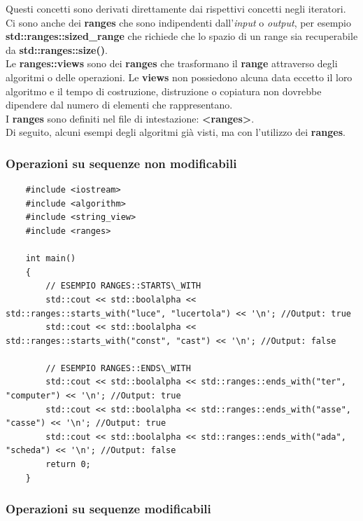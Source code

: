 \textsf{\small Questi concetti sono derivati direttamente dai rispettivi concetti negli iteratori.} \\

\textsf{\small Ci sono anche dei \textbf{ranges} che sono indipendenti dall'\emph{input} o \emph{output}, per esempio \textbf{std::ranges::sized\_range} che richiede che lo spazio di un range sia recuperabile da \textbf{std::ranges::size()}.} \\

\textsf{\small Le \textbf{ranges::views} sono dei \textbf{ranges} che trasformano il \textbf{range} attraverso degli algoritmi o delle operazioni. Le \textbf{views} non possiedono alcuna data eccetto il loro algoritmo e il tempo di costruzione, distruzione o copiatura non dovrebbe dipendere dal numero di elementi che rappresentano.} \\

\textsf{\small I \textbf{ranges} sono definiti nel file di intestazione: \textbf{<ranges>}.} \\

\textsf{\small Di seguito, alcuni esempi degli algoritmi già visti, ma con l'utilizzo dei \textbf{ranges}. } \\

\subsubsection{Operazioni su sequenze non modificabili}

\label{ranges_seq_non_modificabili}

\begin{lstlisting}
	#include <iostream>
	#include <algorithm>
	#include <string_view>
	#include <ranges>
	
	int main()
	{
		// ESEMPIO RANGES::STARTS\_WITH
		std::cout << std::boolalpha << std::ranges::starts_with("luce", "lucertola") << '\n'; //Output: true
		std::cout << std::boolalpha << std::ranges::starts_with("const", "cast") << '\n'; //Output: false
		
		// ESEMPIO RANGES::ENDS\_WITH
		std::cout << std::boolalpha << std::ranges::ends_with("ter", "computer") << '\n'; //Output: true
		std::cout << std::boolalpha << std::ranges::ends_with("asse", "casse") << '\n'; //Output: true
		std::cout << std::boolalpha << std::ranges::ends_with("ada", "scheda") << '\n'; //Output: false
		return 0;
	}
\end{lstlisting}

\subsubsection{Operazioni su sequenze modificabili}

